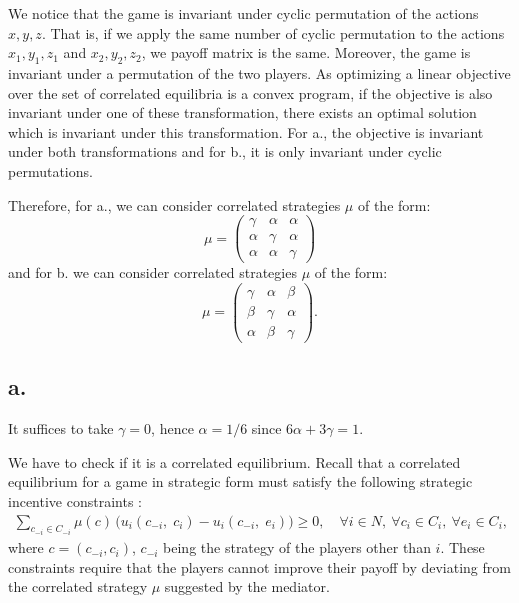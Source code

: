 We notice that the game is invariant under cyclic permutation of the actions $x, y, z$.
That is, if we apply the same number of cyclic permutation to the actions $x_1, y_1, z_1$ and $x_2, y_2, z_2$, we payoff matrix is the same.
Moreover, the game is invariant under a permutation of the two players.
As optimizing a linear objective over the set of correlated equilibria is a convex program, if the objective is also invariant under one of these transformation, there exists an optimal solution which is invariant under this transformation.
For a., the objective is invariant under both transformations and for b., it is only invariant under cyclic permutations.

Therefore, for a., we can consider correlated strategies $\mu$ of the form:
\[
  \mu = \begin{pmatrix}
    \gamma & \alpha & \alpha\\
    \alpha & \gamma & \alpha\\
    \alpha & \alpha & \gamma
  \end{pmatrix}
\]
and for b. we can consider correlated strategies $\mu$ of the form:
\[
  \mu = \begin{pmatrix}
    \gamma & \alpha & \beta\\
    \beta  & \gamma & \alpha\\
    \alpha & \beta  & \gamma
  \end{pmatrix}.
\]

\subsection*{a.}
It suffices to take $\gamma = 0$, hence $\alpha = 1/6$ since $6\alpha + 3\gamma = 1$.

We have to check if it is a correlated equilibrium. Recall that a correlated equilibrium for a game in strategic form must satisfy the following strategic incentive constraints :
\begin{align*}
  \sum_{c_{-i} \in C_{-i}} \mu(c) \, \big( u_i(c_{-i}, \; c_i) - u_i(c_{-i}, \; e_i) \big) \geq 0, \quad \forall i \in N, \ \forall c_i \in C_i, \ \forall e_i \in C_i,
\end{align*}
where $c = (c_{-i}, c_i)$, $c_{-i}$ being the strategy of the players other than $i$. These constraints require that the players cannot improve their payoff by deviating from the correlated strategy $\mu$ suggested by the mediator.

